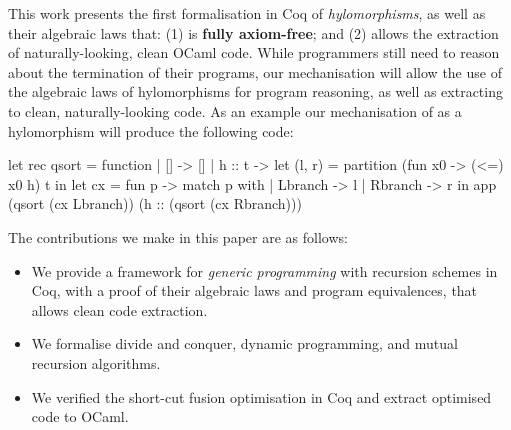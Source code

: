 \documentclass[anonymous, a4paper, UKenglish, cleveref, autoref, thm-restate]{lipics-v2021}
\newcommand{\cata}[1]{\lbans #1 \rbans}
\newcommand{\ana}[1]{\llens #1 \rlens}
\newcommand{\comp}{\cdot}
\newcommand{\operator}[1]{\textsf{#1}}
\newcommand{\InOp}{\operator{in}^{\circ}}
\newcommand{\OutOp}{\operator{out}^{\circ}}
\begin{document}
This work presents the first formalisation in Coq of \emph{hylomorphisms}, as
well as their algebraic laws that: (1) is \textbf{fully axiom-free}; and (2)
allows the extraction of naturally-looking, clean OCaml code. While programmers
still need to reason about the termination of their programs, our mechanisation
will allow the use of the algebraic laws of hylomorphisms for program
reasoning, as well as extracting to clean, naturally-looking code. As an
example our mechanisation of  as a hylomorphism will produce
the following code:
\begin{coqcode}
let rec qsort = function | [] -> []
  | h :: t -> let (l, r) = partition (fun x0 -> (<=) x0 h) t in
              let cx = fun p -> match p with | Lbranch -> l | Rbranch -> r in 
              app (qsort (cx Lbranch)) (h :: (qsort (cx Rbranch)))
\end{coqcode}
The contributions we make in this paper are as follows:
\begin{itemize}
  \item We provide a framework for \emph{generic programming} with recursion
    schemes in Coq, with a proof of their algebraic laws and 
    program equivalences, that allows clean code extraction.
  \item We formalise divide and conquer, dynamic programming, and
    mutual recursion algorithms.
  \item We verified the short-cut fusion optimisation in Coq and
    extract optimised code to OCaml.
\end{itemize}

\end{document}
